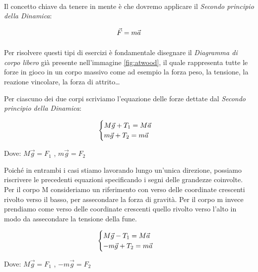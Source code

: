 \newpage
\paragraph{}
Il concetto chiave da tenere in mente è che dovremo applicare il \textit{Secondo principio della Dinamica}: 

\begin{equation*}
    \vec{F}=m\vec{a}
\end{equation*}

\paragraph{}

Per risolvere questi tipi di esercizi è fondamentale disegnare il \textit{Diagramma di corpo libero} già presente nell'immagine \ref{fig:atwood}, il quale rappresenta tutte le forze in gioco in un corpo massivo come ad esempio la forza peso, la tensione, la reazione vincolare, la forza di attrito\dots

Per ciascuno dei due corpi scriviamo l'equazione delle forze dettate dal \textit{Secondo principio della Dinamica}: 

$$
\begin{cases}

    M\vec{g} + T_1 = M\veca\\
    m\vec{g} + T_2 = m\veca
     
\end{cases}
$$
\begin{center}
 Dove: \qquad $M\vec{g} = F_1$ \quad ,  \quad $m\vec{g} = F_2$   
\end{center}

Poiché in entrambi i casi stiamo lavorando lungo un’unica direzione, possiamo riscrivere le precedenti equazioni specificando i segni delle grandezze coinvolte. Per il corpo M consideriamo un riferimento con verso delle coordinate crescenti rivolto verso il basso, per assecondare la forza di gravità. Per il corpo m invece prendiamo come verso delle coordinate crescenti quello rivolto verso l’alto in modo da assecondare la tensione della fune.

$$
\begin{cases}

    M\vec{g} - T_1 = M\veca\\
    -m\vec{g} + T_2 = m\veca
     
\end{cases}
$$
\begin{center}
 Dove: \qquad $M\vec{g} = F_1$ \quad ,  \quad $-m\vec{g} = F_2$   
\end{center}

